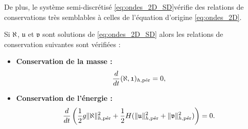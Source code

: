 De plus, le système semi-discrétisé \eqref{eq:ondes_2D_SD}vérifie des relations de conservations très semblables à celles de l'équation d'origine \eqref{eq:ondes_2D}.

\begin{proposition}
Si $\etafrak$, $\mathfrak{u}$ et $\mathfrak{v}$ sont solutions de \eqref{eq:ondes_2D_SD} alors les relations de conservation suivantes sont vérifiées :
\begin{itemize}
\item \textbf{Conservation de la masse :}
\begin{equation}
\dfrac{d}{dt} (\etafrak, \mathfrak{1})_{h,\per} = 0,
\end{equation}
\item \textbf{Conservation de l'énergie :}
\begin{equation}
\dfrac{d}{dt} \left( \dfrac{1}{2} g \| \etafrak \|_{h,\per}^2 + \dfrac{1}{2} H ( \| \mathfrak{u} \|_{h,\per}^2 +  \| \mathfrak{v} \|_{h,\per}^2) \right) = 0.
\end{equation}
\end{itemize}
\end{proposition}

